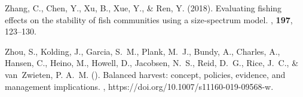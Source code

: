 \documentclass[12pt, letter]{article}
\begin{document}
\begin{thebibliography}{}
Zhang, C., Chen, Y., Xu, B., Xue, Y., \& Ren, Y. (2018).
\newblock Evaluating fishing effects on the stability of fish communities using
  a size-spectrum model.
, {\bf 197}, 123--130.

Zhou, S., Kolding, J., Garcia, S.~M., Plank, M.~J., Bundy, A., Charles, A.,
  Hansen, C., Heino, M., Howell, D., Jacobsen, N.~S., Reid, D.~G., Rice, J.~C.,
  \& {van~Zwieten}, P. A.~M. ({}).
\newblock Balanced harvest: concept, policies, evidence, and management
  implications.
,
  https://doi.org/10.1007/s11160-019-09568-w.

\end{thebibliography}

% 

\clearpage

\end{document}
